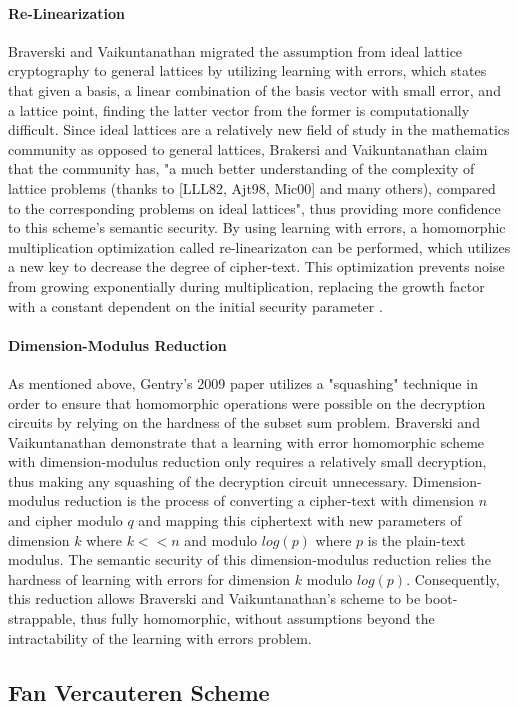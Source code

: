 \documentclass[10pt, a4paper]{article}
\begin{document}
	\paragraph{Re-Linearization}
	Braverski and Vaikuntanathan migrated the assumption from ideal lattice cryptography to general lattices by utilizing learning with errors, which states that given a basis, a linear combination of the basis vector with small error, and a lattice point, finding the latter vector from the former is computationally difficult. Since ideal lattices are a relatively new field of study in the mathematics community as opposed to general lattices, Brakersi and Vaikuntanathan claim that the community has, "a much better understanding of the complexity of lattice problems (thanks to [LLL82, Ajt98, Mic00] and many others), compared to the corresponding problems on ideal lattices"\cite{brakerski2014efficient}, thus providing more confidence to this scheme's semantic security. By using learning with errors, a homomorphic multiplication optimization called re-linearizaton can be performed, which utilizes a new key to decrease the degree of cipher-text. This optimization prevents noise from growing exponentially during multiplication, replacing the growth factor with a constant dependent on the initial security parameter \lambda. 
	\paragraph{Dimension-Modulus Reduction}
	As mentioned above, Gentry's 2009 paper utilizes a "squashing" technique in order to ensure that homomorphic operations were possible on the decryption circuits by relying on the hardness of the subset sum problem. Braverski and Vaikuntanathan demonstrate that a learning with error homomorphic scheme with dimension-modulus reduction only requires a relatively small decryption, thus making any squashing of the decryption circuit unnecessary. Dimension-modulus reduction is the process of converting a cipher-text with dimension $n$ and cipher modulo $q$ and mapping this ciphertext with new parameters of dimension $k$ where $k << n$ and modulo $log(p)$ where $p$ is the plain-text modulus. The semantic security of this dimension-modulus reduction relies the hardness of learning with errors for dimension $k$ modulo $log(p)$. Consequently, this reduction allows Braverski and Vaikuntanathan's scheme to be boot-strappable, thus fully homomorphic, without assumptions beyond the intractability of the learning with errors problem.
	\subsection{Fan Vercauteren Scheme}
	
\end{document}
